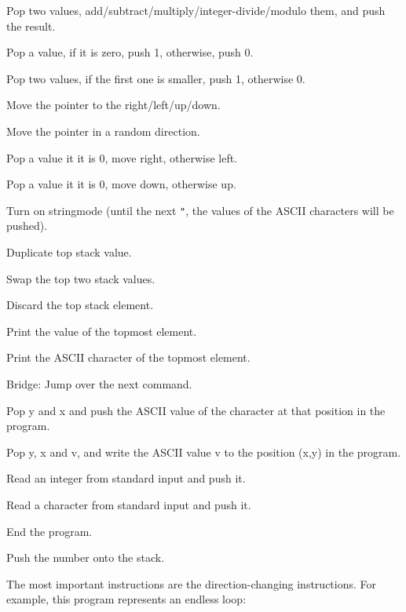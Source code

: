 \begin{description}[labelsep=1em]
    \item[\texttt{+} \texttt{-} \texttt{*} \texttt{/} \texttt{\%}] Pop two values, add/subtract/multiply/integer-divide/modulo them, and push the result.
    \item[\texttt{!}] Pop a value, if it is zero, push 1, otherwise, push 0.
    \item[\texttt{`}] Pop two values, if the first one is smaller, push 1, otherwise 0.
    \item[\texttt{>} \texttt{<} \texttt{\^} \texttt{v}] Move the pointer to the right/left/up/down.
    \item[\texttt{?}] Move the pointer in a random direction.
    \item[\texttt{\_}] Pop a value it it is 0, move right, otherwise left.
    \item[\texttt{|}] Pop a value it it is 0, move down, otherwise up.
    \item[\texttt{"}] Turn on stringmode (until the next \texttt{"}, the values of the ASCII characters will be pushed).
    \item[\texttt{:}] Duplicate top stack value.
    \item[\texttt{\\}] Swap the top two stack values.
    \item[\texttt{\$}] Discard the top stack element.
    \item[\texttt{.}] Print the value of the topmost element.
    \item[\texttt{,}] Print the ASCII character of the topmost element.
    \item[\texttt{\#}] Bridge: Jump over the next command.
    \item[\texttt{g}] Pop y and x and push the ASCII value of the character at that position in the program.
    \item[\texttt{p}] Pop y, x and v, and write the ASCII value v to the position (x,y) in the program.
    \item[\texttt{\&}] Read an integer from standard input and push it.
    \item[\texttt{\~}] Read a character from standard input and push it.
    \item[\texttt{@}] End the program.
    \item[\texttt{0-9}] Push the number onto the stack.
\end{description}

The most important instructions are the direction-changing instructions. For example, this program represents an endless loop:

